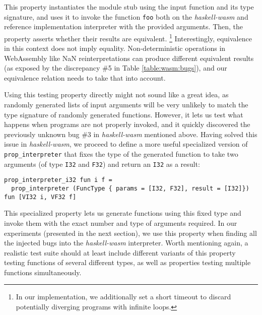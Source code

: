 \documentclass[acmsmall, anonymous]{acmart}
\newcommand{\mutagen}{\textsc{Mutagen}\xspace}
\begin{document}
This property instantiates the module stub using the input function and its type
signature, and uses it to invoke the function \texttt{foo} both on the
\textit{haskell-wasm} and reference implementation interpreter with the provided
arguments.
%
Then, the property asserts whether their results are equivalent.%
%
\footnote{In our implementation, we additionally set a short timeout to discard
  potentially diverging programs with infinite loops.}
%
Interestingly, equivalence in this context does not imply equality.
%
Non-deterministic operations in WebAssembly like NaN reinterpretations can
produce different equivalent results (as exposed by the discrepancy \#5 in Table
\ref{table:wasm:bugs}), and our equivalence relation needs to take that into
account.
%


Using this testing property directly might not sound like a great idea, as
randomly generated lists of input arguments will be very unlikely to match the
type signature of randomly generated functions.
%
However, it lets us test what happens when programs are not properly invoked,
and it quickly discovered the previously unknown bug \#3 in
\textit{haskell-wasm} mentioned above.
%
Having solved this issue in \textit{haskell-wasm}, we proceed to define a more
useful specialized version of \texttt{prop\_interpreter} that fixes the type of
the generated function to take two arguments (of type \texttt{I32} and
\texttt{F32}) and return an \texttt{I32} as a result:

\begin{verbatim}
prop_interpreter_i32 fun i f =
  prop_interpreter (FuncType { params = [I32, F32], result = [I32]}) fun [VI32 i, VF32 f]
\end{verbatim}

This specialized property lets us generate functions using this fixed type and
invoke them with the exact number and type of arguments required.
%
In our experiments (presented in the next section), we use this property when
finding all the injected bugs into the \textit{haskell-wasm} interpreter.
%
Worth mentioning again, a realistic test suite should at least include different
variants of this property testing functions of several different types, as well
as properties testing multiple functions simultaneously.

\end{document}
